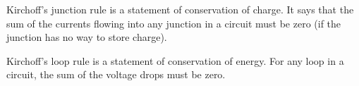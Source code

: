 Kirchoff's junction rule is a statement of conservation of charge. It says that
the sum of the currents flowing into any junction in a circuit must be zero (if
the junction has no way to store charge).

Kirchoff's loop rule is a statement of conservation of energy. For any loop in
a circuit, the sum of the voltage drops must be zero.
